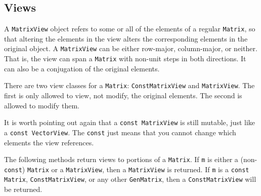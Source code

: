 \documentclass[twoside,letterpaper,11pt]{article}
\renewcommand{\tt}[1]{{\lstinline {#1}}}
\begin{document}
\subsection{Views}
\label{Matrix_Views}

A \tt{MatrixView} object refers to some or all of the elements of a regular \tt{Matrix},
so that altering the elements in the view alters the
corresponding elements in the original object.  A \tt{MatrixView}
can be either row-major, column-major, or neither.  That is, the view can 
span a \tt{Matrix} with non-unit steps in both directions.
It can also be a conjugation of the original
elements.

There are two view classes for
a \tt{Matrix}:
\tt{ConstMatrixView} and \tt{MatrixView}.  
The first is only allowed to view,
not modify, the original elements.  The second is allowed to modify them.

It is worth pointing out again that a 
\tt{const MatrixView} is still mutable, just like a \tt{const VectorView}.
The \tt{const} just means that you cannot change which elements
the view references.

The following methods return views to portions of a \tt{Matrix}.
If \tt{m} is either a (non-\tt{const}) \tt{Matrix}
or a \tt{MatrixView}, then a \tt{MatrixView} is returned.
If \tt{m} is a \tt{const Matrix}, \tt{ConstMatrixView}, or any other \tt{GenMatrix},
then a \tt{ConstMatrixView} will be returned. 
\end{document}
